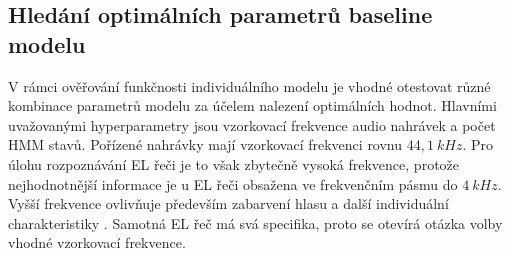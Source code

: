 
\subsection{Hledání optimálních parametrů baseline modelu}
\label{chap:construction:results:baseline}


V rámci ověřování funkčnosti individuálního modelu je vhodné otestovat různé kombinace parametrů modelu za účelem nalezení optimálních hodnot.
Hlavními uvažovanými hyperparametry jsou vzorkovací frekvence audio nahrávek a počet HMM stavů.
Pořízené nahrávky mají vzorkovací frekvenci rovnu $44,1\ kHz$.
Pro úlohu rozpoznávání EL řeči je to však zbytečně vysoká frekvence, protože nejhodnotnější informace je u EL řeči obsažena ve frekvenčním pásmu do $4\ kHz$.
Vyšší frekvence ovlivňuje především zabarvení hlasu a další individuální charakteristiky \cite{Psutka2006}.
Samotná EL řeč má svá specifika, proto se otevírá otázka volby vhodné vzorkovací frekvence.

